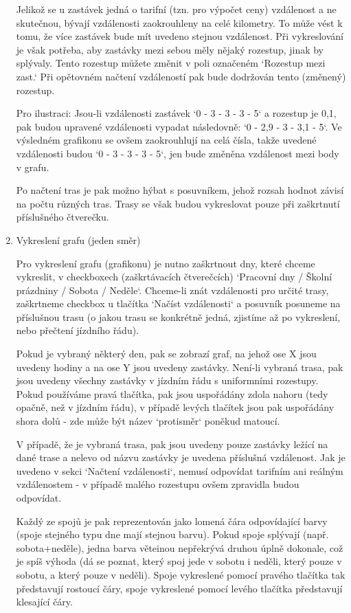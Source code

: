 \documentclass[14pt]{article}
\begin{document}
\begin{enumerate}
Jelikož se u zastávek jedná o tarifní (tzn. pro výpočet ceny) vzdálenost a ne skutečnou, bývají vzdálenosti zaokrouhleny na celé kilometry. To může vést k tomu, že více zastávek bude mít uvedeno stejnou vzdálenost. 
Při vykreslování je však potřeba, aby zastávky mezi sebou měly nějaký rozestup, jinak by splývaly. Tento rozestup můžete změnit v poli označeném `Rozestup mezi zast.` Při opětovném načtení vzdáleností pak bude dodržován tento (změnený) rozestup.

Pro ilustraci: Jsou-li vzdálenosti zastávek `0 - 3 - 3 - 3 - 5` a rozestup je 0,1, pak budou upravené vzdálenosti vypadat následovně: `0 - 2,9 - 3 - 3,1 - 5`. Ve výsledném grafikonu se ovšem zaokrouhlují na celá čísla, takže uvedené vzdálenosti budou `0 - 3 - 3 - 3 - 5`, jen bude změněna vzdálenost mezi body v grafu.

Po načtení tras je pak možno hýbat s posuvníkem, jehož rozsah hodnot závisí na počtu různých tras. Trasy se však budou vykreslovat pouze při zaškrtnutí příslušného čtverečku.

\item Vykreslení grafu (jeden směr)

Pro vykreslení grafu (grafikonu) je nutno zaškrtnout dny, které chceme vykreslit, v checkboxech (zaškrtávacích čtverečcích) `Pracovní dny / Školní prázdniny / Sobota / Neděle`. Chceme-li znát vzdálenosti pro určité trasy, zaškrtneme checkbox u tlačítka `Načíst vzdálenosti` a posuvník posuneme na příslušnou trasu 
(o jakou trasu se konkrétně jedná, zjistíme až po vykreslení, nebo přečtení jízdního řádu).

Pokud je vybraný některý den, pak se zobrazí graf, na jehož ose X jsou uvedeny hodiny a na ose Y jsou uvedeny zastávky. Není-li vybraná trasa, pak jsou uvedeny všechny zastávky v jízdním řádu s uniformními rozestupy. Pokud používáme pravá tlačítka, pak jsou uspořádány zdola nahoru (tedy opačně, než v jízdním řádu), v případě levých tlačítek jsou pak uspořádány shora dolů - zde může být název `protisměr` poněkud matoucí.

V případě, že je vybraná trasa, pak jsou uvedeny pouze zastávky ležící na dané trase a nelevo od názvu zastávky je uvedena příslušná vzdálenost. Jak je uvedeno v sekci `Načtení vzdálenosti`, nemusí odpovídat tarifním ani reálným vzdálenostem - v případě malého rozestupu ovšem zpravidla budou odpovídat.

Každý ze spojů je pak reprezentován jako lomená čára odpovídající barvy (spoje stejného typu dne mají stejnou barvu). Pokud spoje splývají (např. sobota+neděle), jedna barva věteinou nepřekrývá druhou úplně dokonale, což je spíš výhoda (dá se poznat, který spoj jede v sobotu i neděli, který pouze v sobotu, a který pouze v neděli). Spoje vykreslené pomocí pravého tlačítka tak představují rostoucí čáry, spoje vykreslené pomocí levého tlačítka představují klesající čáry.


\end{enumerate}
\end{document}
